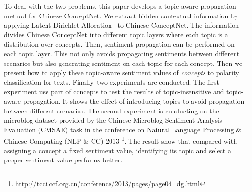 To deal with the two problems, this paper develops a topic-aware propagation method for Chinese ConceptNet. We extract hidden contextual information by applying Latent Dirichlet Allocation~\cite{Blei:LDA03} to Chinese ConceptNet. The information divides Chinese ConceptNet into different topic layers where each topic is a distribution over concepts. Then, sentiment propagation can be performed on each topic layer. This not only avoids propagating sentiments between different scenarios but also generating sentiment on each topic for each concept. Then we present how to apply these topic-aware sentiment values of {\it concepts} to polarity classification for texts. Finally, two experiments are conducted. The first experiment use part of concepts to test the results of topic-insensitive and topic-aware propagation. It shows the effect of introducing topics to avoid propagation between different scenarios. The second experiment is conducting on the microblog dataset provided by the Chinese Microblog Sentiment Analysis Evaluation (CMSAE) task in the conference on Natural Language Processing \& Chinese Computing (NLP \& CC) 2013 \footnote{\url{http://tcci.ccf.org.cn/conference/2013/pages/page04_dg.html}}. The result show that compared with assigning a concept a fixed sentiment value, identifying its topic and select a proper sentiment value performs better.